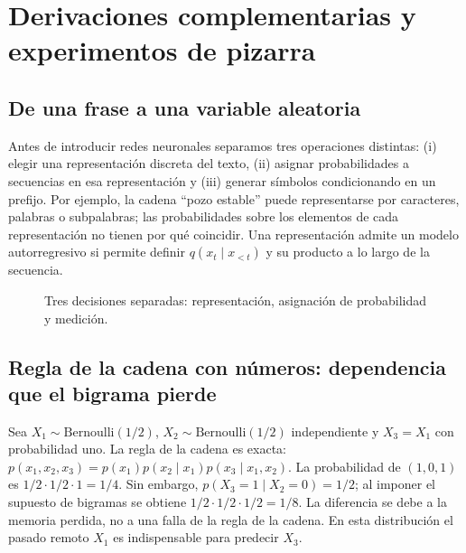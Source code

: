 
\chapter*{Derivaciones complementarias y experimentos de pizarra}

\section*{De una frase a una variable aleatoria}
Antes de introducir redes neuronales separamos tres operaciones distintas:
(i) elegir una representación discreta del texto, (ii) asignar probabilidades a
secuencias en esa representación y (iii) generar símbolos condicionando en un
prefijo. Por ejemplo, la cadena ``pozo estable'' puede representarse por caracteres,
palabras o subpalabras; las probabilidades sobre los elementos de cada representación
no tienen por qué coincidir. Una representación admite un modelo autorregresivo
si permite definir $q(x_t\mid x_{<t})$ y su producto a lo largo de la secuencia.

\begin{figure}[H]\centering
{}
\caption{Tres decisiones separadas: representación, asignación de probabilidad y medición.}
\end{figure}

\section*{Regla de la cadena con números: dependencia que el bigrama pierde}
Sea $X_1\sim\mathrm{Bernoulli}(1/2)$, $X_2\sim\mathrm{Bernoulli}(1/2)$ independiente
y $X_3=X_1$ con probabilidad uno. La regla de la cadena es exacta:
$p(x_1,x_2,x_3)=p(x_1)p(x_2\mid x_1)p(x_3\mid x_1,x_2)$.
La probabilidad de $(1,0,1)$ es $1/2\cdot1/2\cdot1=1/4$. Sin embargo,
$p(X_3=1\mid X_2=0)=1/2$; al imponer el supuesto de bigramas se obtiene
$1/2\cdot1/2\cdot1/2=1/8$. La diferencia se debe a la memoria perdida, no
a una falla de la regla de la cadena. En esta distribución el pasado remoto
$X_1$ es indispensable para predecir $X_3$.

